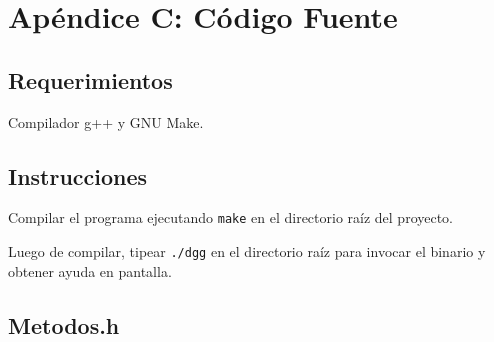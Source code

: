 \documentclass[a4paper,10pt,twoside]{article}
\begin{document}







\section{Apéndice C: Código Fuente}


\subsection{Requerimientos}

Compilador g++ y GNU Make.


\subsection{Instrucciones}

Compilar el programa ejecutando \texttt{make} en el directorio raíz del proyecto.

Luego de compilar, tipear \texttt{./dgg} en el directorio raíz para invocar el
binario y obtener ayuda en pantalla.


\subsection{Metodos.h}

\end{document}
